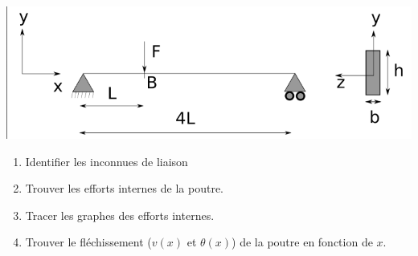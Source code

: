 \documentclass[lecture.tex]{subfiles}
\begin{document}
\exercice{}


\begin{center}
  \includegraphics[scale=0.5]{exo-flexion-poutre.png}
\end{center}

\begin{enumerate}
  \item Identifier les inconnues de liaison
  \item Trouver les efforts internes de la poutre.
  \item Tracer les graphes des efforts internes.
  \item Trouver le fléchissement ($v(x)$ et $\theta(x)$) de la poutre en fonction de $x$.
\end{enumerate}

\finexercice
\end{document}
